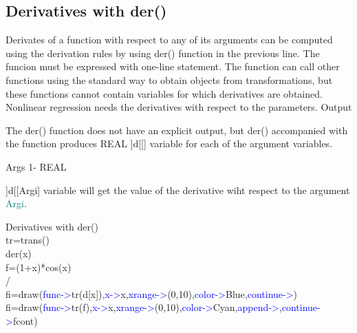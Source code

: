 \begin{itemize}
\subsection{Derivatives with \textcolor{VioletRed}{der}()}
\label{der}
Derivates of a function with respect to any of its arguments can be
computed using the derivation rules by using \textcolor{VioletRed}{der}() function in the previous line. The funcion must be expressed with
one-line statement. The function can call other functions using the standard way
to obtain objects from transformations, but these functions cannot
contain variables for which derivatives are obtained.
Nonlinear regression needs the derivatives with respect to the parameters.
\vspace{0.3cm}
\hline
\vspace{0.3cm}
\noindent Output  \tabto{3cm}    \tabto{5cm}     \tabto{7cm}
\begin{changemargin}{3cm}{0cm}
\noindent  The \textcolor{VioletRed}{der}() function does not have an explicit output, but
\textcolor{VioletRed}{der}() accompanied with the function produces REAL ]d[[] variable for each of the
argument variables.
\end{changemargin}
\vspace{0.3cm}
\hline
\vspace{0.3cm}
\noindent Args  \tabto{3cm} 1-  \tabto{5cm}   REAL  \tabto{7cm}
\begin{changemargin}{3cm}{0cm}
\noindent   ]d[[Argi] variable will get the value of the derivative wiht
respect to the argument \textcolor{teal}{Argi}.
\end {changemargin}
\hline
\vspace{0.2cm}
\begin{example}[derex]Derivatives with \textcolor{VioletRed}{der}()\\
\label{derex}
tr=\textcolor{VioletRed}{trans}()\\
\textcolor{VioletRed}{der}(x)\\
f=(1+x)*cos(x)\\
/\\
fi=\textcolor{VioletRed}{draw}(\textcolor{blue}{func->}tr(d[x]),\textcolor{blue}{x->}x,\textcolor{blue}{xrange->}(0,10),\textcolor{blue}{color->}Blue,\textcolor{blue}{continue->})\\
fi=\textcolor{VioletRed}{draw}(\textcolor{blue}{func->}tr(f),\textcolor{blue}{x->}x,\textcolor{blue}{xrange->}(0,10),\textcolor{blue}{color->}Cyan,\textcolor{blue}{append->},\textcolor{blue}{continue->}fcont)
\end{example}

\end{itemize}
